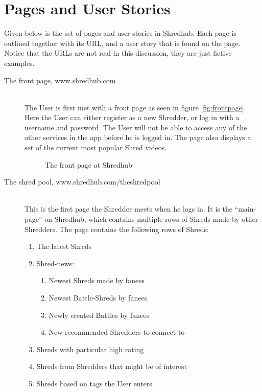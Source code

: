 \section{Pages and User Stories}
Given below is the set of pages and user stories in Shredhub. Each page is outlined together with its URL, and a user story that is found on the page. Notice that the URLs are not real in this discussion, they are just fictive examples.
\begin{description}
		
\item[The front page, www.shredhub.com] \hfill \\
The User is first met with a front page as seen in figure \vref{fig:frontpage}. Here the User can either register as a new Shredder, or log in with a username and password. The User will not be able to access any of the other services in the app before he is logged in. The page also displays a set of the current most popular Shred videos.
\begin{figure}
 \begin{center}
\end{center}
\caption{The front page at Shredhub}\label{fig:frontpage}
\end{figure}

\item [The shred pool, www.shredhub.com/theshredpool] \hfill \\
This is the first page the Shredder meets when he logs in. It is the ``main-page'' on Shredhub, which contains multiple rows of Shreds made by other Shredders. The page contains the following rows of Shreds:
\begin{enumerate}
\item{} The latest Shreds
\item{} Shred-news:
	\begin{enumerate}
		\item{} Newest Shreds made by fanees
		\item{} Newest Battle-Shreds by fanees
		\item{} Newly created Battles by fanees
		\item{} New recommended Shredders to connect to
	\end{enumerate}
\item{} Shreds with particular high rating
\item{} Shreds from Shredders that might be of interest
\item{} Shreds based on tags the User enters
\end{enumerate}


\end{description}
